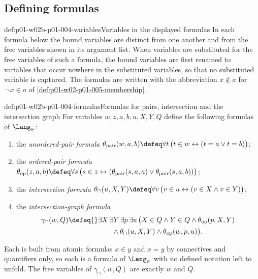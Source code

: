 \subsection{Defining formulas}
\label{sec:p01-w02b-p01-004-formulas}

\begin{hbconvention}{def:p01-w02b-p01-004-variables}{Variables in the displayed formulas}
In each formula below the bound variables are distinct from one another and
from the free variables shown in its argument list. When variables are
substituted for the free variables of such a formula, the bound variables are
first renamed to variables that occur nowhere in the substituted variables, so
that no substituted variable is captured. The formulas are written with the
abbreviation \(x\notin a\) for \(\neg\,x\in a\) of
\cref{def:p01-w02-p01-005-membership}.
\end{hbconvention}

\begin{hbdefinition}{def:p01-w02b-p01-004-formulas}{Formulas for pairs, intersection and the intersection graph}
For variables \(w,z,a,b,u,X,Y,Q\) define the following formulas of
\(\Lang_{\in}\):
\begin{enumerate}
  \item the \emph{unordered-pair formula}
        \(\theta_{\mathrm{pair}}(w,a,b)\defeq
        \forall t\,\bigl(t\in w\leftrightarrow(t=a\lor t=b)\bigr)\);
  \item the \emph{ordered-pair formula}
        \(\theta_{\mathrm{op}}(z,a,b)\defeq
        \forall s\,\bigl(s\in z\leftrightarrow
        (\theta_{\mathrm{pair}}(s,a,a)\lor\theta_{\mathrm{pair}}(s,a,b))\bigr)\);
  \item the \emph{intersection formula}
        \(\theta_{\cap}(u,X,Y)\defeq
        \forall v\,\bigl(v\in u\leftrightarrow(v\in X\land v\in Y)\bigr)\);
  \item the \emph{intersection-graph formula}
        \[
          \begin{aligned}
            \gamma_{\cap}(w,Q)\defeq{}&
            \exists X\,\exists Y\,\exists p\,\exists u\,
            \bigl(X\in Q\land Y\in Q\land\theta_{\mathrm{op}}(p,X,Y)\\
            &\qquad\land\theta_{\cap}(u,X,Y)\land\theta_{\mathrm{op}}(w,p,u)\bigr).
          \end{aligned}
        \]
\end{enumerate}
Each is built from atomic formulas \(x\in y\) and \(x=y\) by connectives and
quantifiers only, so each is a formula of \(\Lang_{\in}\) with no defined
notation left to unfold. The free variables of \(\gamma_{\cap}(w,Q)\) are
exactly \(w\) and \(Q\).
\end{hbdefinition}

